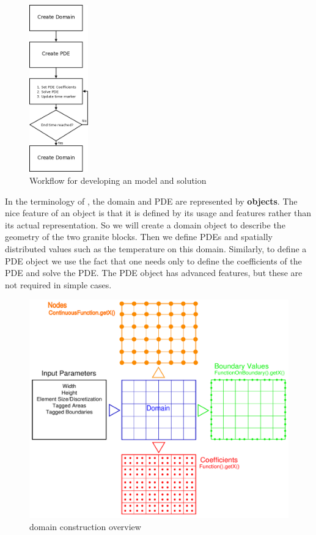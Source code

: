 \begin{figure}[h!]
 \centering
   \includegraphics[width=1in]{figures/workflow.png}
   \caption{Workflow for developing an \esc model and solution}
   \label{fig:wf}
\end{figure}

In the terminology of \pyt, the domain and PDE are represented by
\textbf{objects}. The nice feature of an object is that it is defined by its
usage and features
rather than its actual representation. So we will create a domain object to
describe the geometry of the two
granite blocks. Then we define PDEs and spatially distributed values such as the
temperature 
on this domain. Similarly, to define a PDE object we use the fact that one needs
only to define the coefficients of the PDE and solve the PDE. The PDE object has
advanced features, but these are not required in simple cases.


\begin{figure}[htp]
 \centering
   \includegraphics[width=6in]{figures/functionspace.pdf}
   \caption{\esc domain construction overview}
   \label{fig:fs}
\end{figure}

